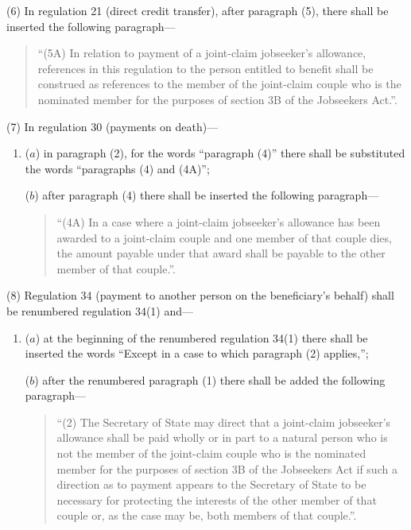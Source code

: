 \documentclass[12pt,a4paper]{article}
\begin{document}
(6) In regulation 21 (direct credit transfer), after paragraph (5), there shall be inserted the following paragraph—
\begin{quotation}
“(5A) In relation to payment of a joint-claim jobseeker’s allowance, references in this regulation to the person entitled to benefit shall be construed as references to the member of the joint-claim couple who is the nominated member for the purposes of section 3B of the Jobseekers Act.”.
\end{quotation}

(7) In regulation 30 (payments on death)—
\begin{enumerate}\item[]
($a$) in paragraph (2), for the words “paragraph (4)” there shall be substituted the words “paragraphs (4) and (4A)”;

($b$) after paragraph (4) there shall be inserted the following paragraph—
\begin{quotation}
\begin{sloppypar}
“(4A) In a case where a joint-claim jobseeker’s allowance has been awarded to a joint-claim couple and one member of that couple dies, the amount payable under that award shall be payable to the other member of that couple.”.
\end{sloppypar}
\end{quotation}
\end{enumerate}

(8) Regulation 34 (payment to another person on the beneficiary’s behalf) shall be renumbered regulation 34(1) and—
\begin{enumerate}\item[]
($a$) at the beginning of the renumbered regulation 34(1) there shall be inserted the words “Except in a case to which paragraph (2) applies,”;

($b$) after the renumbered paragraph (1) there shall be added the following paragraph—
\begin{quotation}
“(2) The Secretary of State may direct that a joint-claim jobseeker’s allowance shall be paid wholly or in part to a natural person who is not the member of the joint-claim couple who is the nominated member for the purposes of section 3B of the Jobseekers Act if such a direction as to payment appears to the Secretary of State to be necessary for protecting the interests of the other member of that couple or, as the case may be, both members of that couple.”.
\end{quotation}
\end{enumerate}
\end{document}
